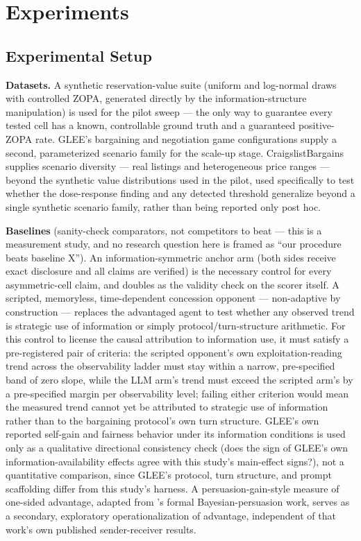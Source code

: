 \documentclass[11pt]{article}
\begin{document}
\section{Experiments}

\subsection{Experimental Setup}

\textbf{Datasets.} A synthetic reservation-value suite (uniform and log-normal draws with controlled ZOPA, generated directly by the information-structure manipulation) is used for the pilot sweep --- the only way to guarantee every tested cell has a known, controllable ground truth and a guaranteed positive-ZOPA rate. GLEE's \citep{GLEE} bargaining and negotiation game configurations supply a second, parameterized scenario family for the scale-up stage. CraigslistBargains \citep{CraigslistBargains} supplies scenario diversity --- real listings and heterogeneous price ranges --- beyond the synthetic value distributions used in the pilot, used specifically to test whether the dose-response finding and any detected threshold generalize beyond a single synthetic scenario family, rather than being reported only post hoc.

\textbf{Baselines} (sanity-check comparators, not competitors to beat --- this is a measurement study, and no research question here is framed as ``our procedure beats baseline X''). An information-symmetric anchor arm (both sides receive exact disclosure and all claims are verified) is the necessary control for every asymmetric-cell claim, and doubles as the validity check on the scorer itself. A scripted, memoryless, time-dependent concession opponent --- non-adaptive by construction --- replaces the advantaged agent to test whether any observed trend is strategic use of information or simply protocol/turn-structure arithmetic. For this control to license the causal attribution to information use, it must satisfy a pre-registered pair of criteria: the scripted opponent's own exploitation-reading trend across the observability ladder must stay within a narrow, pre-specified band of zero slope, while the LLM arm's trend must exceed the scripted arm's by a pre-specified margin per observability level; failing either criterion would mean the measured trend cannot yet be attributed to strategic use of information rather than to the bargaining protocol's own turn structure. GLEE's \citep{GLEE} own reported self-gain and fairness behavior under its information conditions is used only as a qualitative directional consistency check (does the sign of GLEE's own information-availability effects agree with this study's main-effect signs?), not a quantitative comparison, since GLEE's protocol, turn structure, and prompt scaffolding differ from this study's harness. A persuasion-gain-style measure of one-sided advantage, adapted from \citet{StrategicPersuasion}'s formal Bayesian-persuasion work, serves as a secondary, exploratory operationalization of advantage, independent of that work's own published sender-receiver results.
\end{document}
